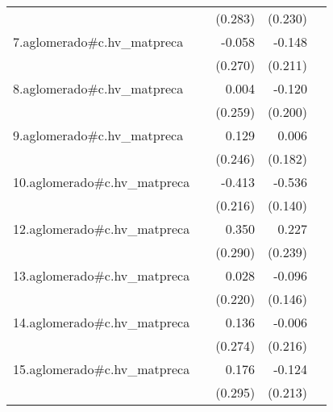 {\begin{longtable}{l*{4}{D{.}{.}{-1}}}
            &                     &     (0.283)         &     (0.230)         &                     \\
\addlinespace
7.aglomerado#c.hv\_matpreca&                     &      -0.058         &      -0.148         &                     \\
            &                     &     (0.270)         &     (0.211)         &                     \\
\addlinespace
8.aglomerado#c.hv\_matpreca&                     &       0.004         &      -0.120         &                     \\
            &                     &     (0.259)         &     (0.200)         &                     \\
\addlinespace
9.aglomerado#c.hv\_matpreca&                     &       0.129         &       0.006         &                     \\
            &                     &     (0.246)         &     (0.182)         &                     \\
\addlinespace
10.aglomerado#c.hv\_matpreca&                     &      -0.413         &      -0.536\sym{***}&                     \\
            &                     &     (0.216)         &     (0.140)         &                     \\
\addlinespace
12.aglomerado#c.hv\_matpreca&                     &       0.350         &       0.227         &                     \\
            &                     &     (0.290)         &     (0.239)         &                     \\
\addlinespace
13.aglomerado#c.hv\_matpreca&                     &       0.028         &      -0.096         &                     \\
            &                     &     (0.220)         &     (0.146)         &                     \\
\addlinespace
14.aglomerado#c.hv\_matpreca&                     &       0.136         &      -0.006         &                     \\
            &                     &     (0.274)         &     (0.216)         &                     \\
\addlinespace
15.aglomerado#c.hv\_matpreca&                     &       0.176         &      -0.124         &                     \\
            &                     &     (0.295)         &     (0.213)         &                     \\

\end{longtable}}
